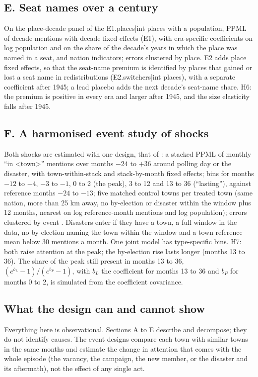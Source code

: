 \documentclass[11pt,a4paper]{article}
\begin{document}
\subsection{E. Seat names over a century}
On the place-decade panel of the {{E1.places|int}} places with a population, PPML of decade mentions with decade fixed effects (E1), with era-specific coefficients on log population and on the share of the decade's years in which the place was named in a seat, and nation indicators; errors clustered by place. E2 adds place fixed effects, so that the seat-name premium is identified by places that gained or lost a seat name in redistributions ({{E2.switchers|int}} places), with a separate coefficient after 1945; a lead placebo adds the next decade's seat-name share. H6: the premium is positive in every era and larger after 1945, and the size elasticity falls after 1945.

\subsection{F. A harmonised event study of shocks}
Both shocks are estimated with one design, that of \citet{hotham2026c}: a stacked PPML \citep{cengiz2019,correia2020} of monthly ``in <town>'' mentions over months $-24$ to $+36$ around polling day or the disaster, with town-within-stack and stack-by-month fixed effects; bins for months $-12$ to $-4$, $-3$ to $-1$, 0 to 2 (the peak), 3 to 12 and 13 to 36 (``lasting''), against reference months $-24$ to $-13$; five matched control towns per treated town (same nation, more than 25 km away, no by-election or disaster within the window plus 12 months, nearest on log reference-month mentions and log population); errors clustered by event \citep{cameronmiller2015,abadie2023}. Disasters enter if they have a town, a full window in the data, no by-election naming the town within the window and a town reference mean below 30 mentions a month. One joint model has type-specific bins. H7: both raise attention at the peak; the by-election rise lasts longer (months 13 to 36). The share of the peak still present in months 13 to 36, $(e^{b_{L}}-1)/(e^{b_{P}}-1)$, with $b_L$ the coefficient for months 13 to 36 and $b_P$ for months 0 to 2, is simulated from the coefficient covariance.

\subsection{What the design can and cannot show}
Everything here is observational. Sections A to E describe and decompose; they do not identify causes. The event designs compare each town with similar towns in the same months and estimate the change in attention that comes with the whole episode (the vacancy, the campaign, the new member, or the disaster and its aftermath), not the effect of any single act.
\end{document}
